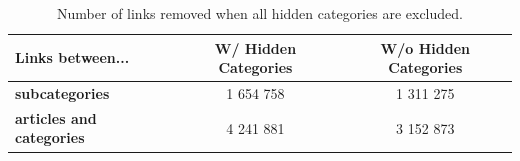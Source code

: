 
\begin{table}[h]
\centering
\begin{tabular}{l|c|c}
\textbf{Links between...} & \textbf{W/ Hidden Categories} & \textbf{W/o Hidden Categories}  \\ \hline
 \textbf{subcategories} & 1 654 758  & 1 311 275\\
 \textbf{articles and categories} & 4 241 881  & 3 152 873
\end{tabular}
\caption[Number of links without hidden categories]{Number of links removed when all hidden categories are excluded. }
\label{tab:withouthiddencat}
\end{table}
